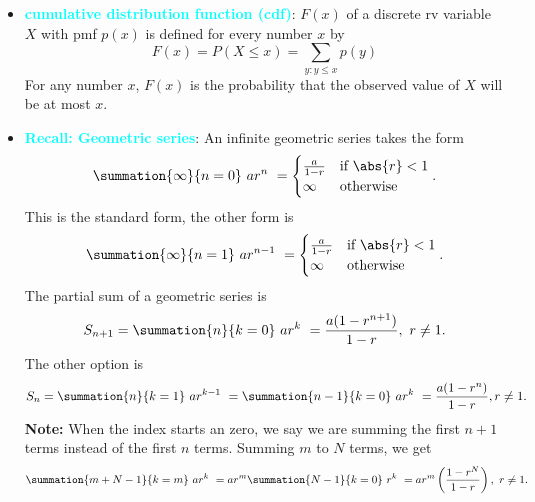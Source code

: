 \documentclass{report}
\begin{document}
\begin{itemize}
    \item \textbf{\textcolor{cyan}{cumulative distribution function (cdf)}}: \( F(x) \) of a discrete rv variable \( X \) with pmf \( p(x) \) is defined for every number \( x \) by
        \[
            F(x) = P(X \leq x) = \sum_{y: y \leq x} p(y) \tag{3.3}
        \]
        For any number \( x \), \( F(x) \) is the probability that the observed value of \( X \) will be at most \( x \).
    \item \textbf{\textcolor{cyan}{Recall: Geometric series}}:
        \bigbreak \noindent 
        An infinite geometric series takes the form
        \begin{align*}
            \summation{\infty}{n=0}\ ar^{n}\ = 
            \begin{cases}
                \frac{a}{1-r} & \text{if } \abs{r} < 1 \\
                \infty & \text{otherwise}
            \end{cases}
        .\end{align*}
        This is the standard form, the other form is 
        \begin{align*}
            \summation{\infty}{n=1}\ ar^{n-1}\ =
            \begin{cases}
                 \frac{a}{1-r} & \text{if } \abs{r} < 1 \\
                \infty & \text{otherwise}
            \end{cases}
        .\end{align*}
        \bigbreak \noindent 
        The partial sum of a geometric series is 
        \begin{align*}
            S_{n+1} = \summation{n}{k=0}\ ar^{k}\ = \frac{a(1-r^{n+1})}{1-r},\ r\neq 1
        .\end{align*}
        \bigbreak \noindent 
        The other option is 
        \begin{align*}
            S_{n} = \summation{n}{k=1}\ ar^{k-1}\ = \summation{n-1}{k=0}\ ar^{k}\ = \frac{a(1-r^{n})}{1-r}, r\neq 1
        .\end{align*}
        \bigbreak \noindent 
        \textbf{Note:} When the index starts an zero, we say we are summing the first $n+1$ terms instead of the first $n$ terms.
        \bigbreak \noindent 
        Summing $m$ to $N$ terms, we get
        \begin{align*}
            \summation{m+N-1}{k=m}\ ar^{k}\ = ar^{m}\summation{N-1}{k=0}\ r^{k}\ = ar^{m}\left(\frac{1-r^{N}}{1-r}\right),\ r\neq 1
        .\end{align*}

\end{itemize}
\end{document}
